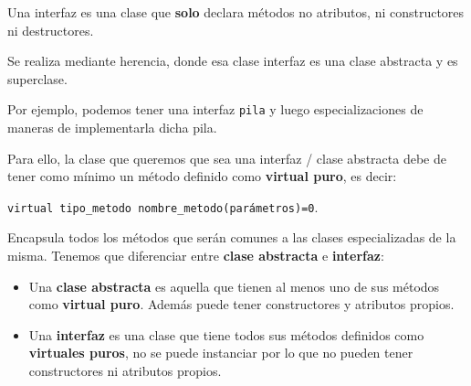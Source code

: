 Una interfaz es una clase que \textbf{solo} declara métodos no atributos, ni constructores ni destructores.

Se realiza mediante herencia, donde esa clase interfaz es una clase abstracta y es superclase.

Por ejemplo, podemos tener una interfaz \texttt{pila} y luego especializaciones de maneras de implementarla dicha pila.

Para ello, la clase que queremos que sea una interfaz / clase abstracta debe de tener como mínimo un método definido como \textbf{virtual puro}, es decir:
\begin{center}
	\texttt{virtual tipo\_metodo nombre\_metodo(parámetros)=0}. 

\end{center} 
Encapsula todos los métodos que serán comunes a las clases especializadas de la misma.
Tenemos que diferenciar entre \textbf{clase abstracta} e \textbf{interfaz}:
\begin{itemize}
	\item Una \textbf{clase abstracta} es aquella que tienen al menos uno de sus métodos como \textbf{virtual puro}. Además puede tener constructores y atributos propios.
	\item Una \textbf{interfaz} es una clase que tiene todos sus métodos definidos como \textbf{virtuales puros}, no se puede instanciar por lo que no pueden tener constructores ni atributos propios.
\end{itemize}